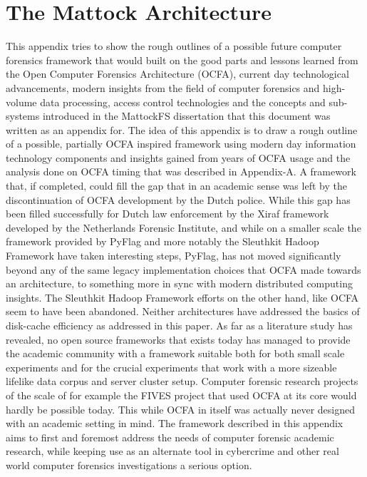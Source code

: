 \chapter{The Mattock Architecture}
This appendix tries to show the rough outlines of a possible future computer forensics framework that would built on the good parts and lessons learned from the Open Computer Forensics Architecture (OCFA), current day technological advancements, modern insights from the field of computer forensics and high-volume data processing, access control technologies and the concepts and sub-systems introduced in the MattockFS dissertation that this document was written as an appendix for. 
The idea of this appendix is to draw a rough outline of a possible, partially OCFA inspired framework using modern day information technology components and insights gained from years of OCFA usage and the analysis done on OCFA timing that was described in Appendix-A. A framework that, if completed, could fill the gap that in an academic sense was left by the discontinuation of OCFA development by the Dutch police. While this gap has been filled successfully for Dutch law enforcement by the Xiraf framework developed by the Netherlands Forensic Institute, and while on a smaller scale the framework provided by PyFlag and more notably the Sleuthkit Hadoop Framework have taken interesting steps, PyFlag, has not moved significantly beyond any of the same legacy implementation choices that OCFA made towards an architecture, to something more in sync with modern distributed computing insights. The Sleuthkit Hadoop Framework efforts on the other hand, like OCFA seem to have been abandoned. Neither architectures have addressed the basics of disk-cache efficiency as addressed in this paper. As far as a literature study has revealed, no open source frameworks that exists today has managed to provide the academic community with a framework suitable both for both small scale experiments and for the crucial experiments that work with a more sizeable lifelike data corpus and server cluster setup. Computer forensic research projects of the scale of for example the FIVES project that used OCFA at its core would hardly be possible today. 
This while OCFA in itself was actually never designed with an academic setting in mind. The framework described in this appendix
aims to first and foremost address the needs of computer forensic academic research, while keeping use as an alternate tool in cybercrime and other real world computer forensics investigations a serious option. 
